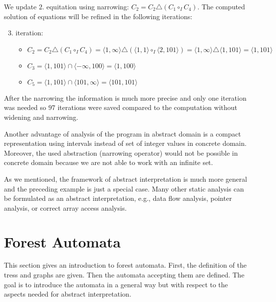 \documentclass[a4paper, 12pt]{article}
\newcommand{\interval}[2]{\langle #1,#2 \rangle}
\newcommand{\ajoin}[0]{\circ}
\newcommand{\nar}[0]{\triangle}
\newcommand{\iintg}[0]{I}
\newcommand{\ijoin}[0]{\ajoin_\iintg}
\begin{document}
We update $2.$ equitation using narrowing:
$C_2 = C_2 \nar (C_1 \ijoin C_4)$.
The computed solution of equations will be refined in the following iterations:
\begin{enumerate}
	\setcounter{enumi}{2}
	\item \hspace{-0.5em} iteration:
		\begin{itemize}
			\item $C_2 = C_2 \nar (C_1 \ijoin C_4) = \interval{1}{\infty} \nar
				(\interval{1}{1} \ijoin \interval{2}{101}) = \interval{1}{\infty} \nar \interval{1}{101} = 
				\interval{1}{101}$
			\item $C_3 = \interval{1}{101} \cap \interval{-\infty}{100} = \interval{1}{100}$
			\item $C_5 = \interval{1}{101} \cap \interval{101}{\infty} = \interval{101}{101}$
		\end{itemize}
\end{enumerate}

After the narrowing the information is much more precise and only one iteration
was needed so $97$ iterations were saved compared to the computation without
widening and narrowing.

Another advantage of analysis of the program in abstract domain is a compact
representation using intervals instead of set of integer values in concrete domain.
Moreover, the used abstraction (narrowing operator) would not be possible in
concrete domain because we are not able to work with an infinite set.
\vspace{-0.5cm}
\eexmp
\vspace{0.5cm}


As we mentioned, the framework of abstract interpretation
is much more general and the preceding example is just
a special case.
Many other static analysis can be formulated as
an abstract interpretation, e.g., data flow analysis,
pointer analysis, or correct array access analysis.

\section{Forest Automata}
\label{sec:fa}

This section gives an introduction to forest automata.
First, the definition of the tress and graphs are given.
Then the automata accepting them are defined.
The goal is to introduce the automata in a general way
but with respect to the aspects needed for abstract interpretation.
\end{document}
